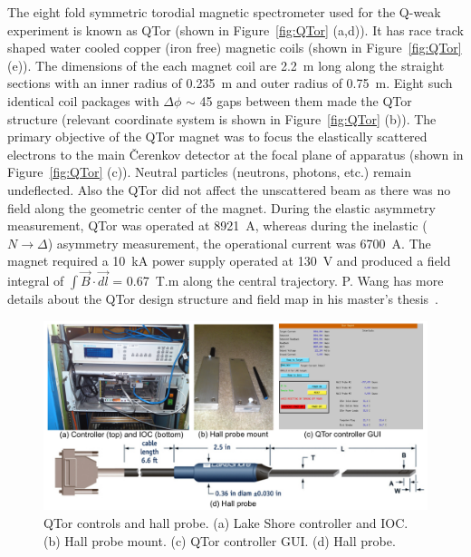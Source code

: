 The eight fold symmetric torodial magnetic spectrometer used for the Q-weak experiment is known as QTor (shown in Figure~\ref{fig:QTor} (a,d)). It has race track shaped water cooled copper (iron free) magnetic coils (shown in Figure~\ref{fig:QTor} (e)). The dimensions of the each magnet coil are 2.2~m long along the straight sections with an inner radius of 0.235~m and outer radius of  0.75~m. Eight such identical coil packages with $\Delta\phi$ $\sim$ 45\degrees{} gaps between them made the QTor structure (relevant coordinate system is shown in Figure~\ref{fig:QTor} (b)). The primary objective of the QTor magnet was to focus the elastically scattered electrons to the main \v{C}erenkov detector at the focal plane of apparatus (shown in Figure~\ref{fig:QTor} (c)). 
Neutral particles (neutrons, photons, etc.) remain undeflected. Also the QTor did not affect the unscattered beam as there was no field along the geometric center of the magnet.
During the elastic asymmetry measurement, QTor was operated at 8921~A, whereas during the inelastic ($N\rightarrow\Delta$) asymmetry measurement, the operational current was 6700~A. The magnet required a 10~kA power supply operated at 130~V and produced a field integral of $\int \vec{B} \cdot \vec{dl}$ = 0.67~T.m along the central trajectory. P. Wang has more details about the QTor design structure and field map in his master's thesis~\cite{peiqing_qweak_masters}.


\begin{singlespace}
\begin{figure}[!h]
	\begin{center}
	\includegraphics[width=15cm]{figures/QTorHallProbe}
	\caption
	{QTor controls and hall probe. (a) Lake Shore controller and IOC. (b) Hall probe mount. (c) QTor controller GUI. (d) Hall probe. }
	\label{fig:QTorHallProbe}
	\end{center}
\end{figure}
\end{singlespace}

